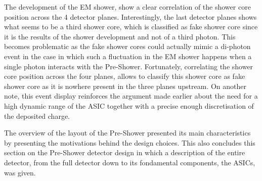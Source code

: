 		The development of the EM shower, show a clear correlation of the shower core position across the 4 detector planes. Interestingly, the last detector planes shows what seems to be a third shower core, which is classified as fake shower core since it is the results of the shower development and not of a third photon. This becomes problematic as the fake shower cores could actually mimic a di-photon event in the case in which such a fluctuation in the EM shower happens when a single photon interacts with the Pre-Shower. Fortunately, correlating the shower core position across the four planes, allows to classify this shower core as fake shower core as it is nowhere present in the three planes upstream. On another note, this event display reinforces the argument made earlier about the need for a high dynamic range of the ASIC together with a precise enough discretisation of the deposited charge.
		
		The overview of the layout of the Pre-Shower presented its main characteristics by presenting the motivations behind the design choices. This also concludes this section on the Pre-Shower detector design in which a description of the entire detector, from the full detector down to its fondamental components, the ASICs, was given.    	
		
		
		
		
		
		
		
		
		
		
		
		
		
		
		
		
		
		
		
		
		
		
		
		
		
		
		
		
		
		
		
		
		
		
		
		
		
		
		
		
	\clearpage	
%		
		
		
		
		
		
		
		
		
		
		